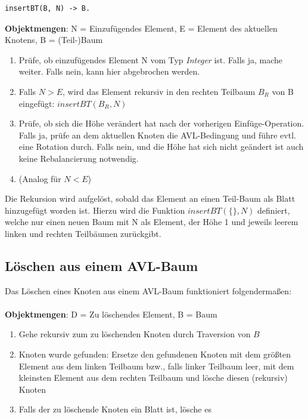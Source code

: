 \documentclass{article}
\begin{document}
\begin{lstlisting}
insertBT(B, N) -> B.
\end{lstlisting}

	\textbf{Objektmengen}: N = Einzufügendes Element, E = Element des aktuellen Knotens, B = (Teil-)Baum
	
	\begin{enumerate}
		\item Prüfe, ob einzufügendes Element N vom Typ \textit{Integer} ist. Falls ja, mache weiter. Falls nein, kann hier abgebrochen werden.
		\item Falls $N > E$, wird das Element rekursiv in den rechten Teilbaum $B_R$ von B eingefügt: $insertBT(B_R, N)$
		\item Prüfe, ob sich die Höhe verändert hat nach der vorherigen Einfüge-Operation. Falls ja, prüfe an dem aktuellen Knoten die AVL-Bedingung und führe evtl. eine Rotation durch. Falls nein, und die Höhe hat sich nicht geändert ist auch keine Rebalancierung notwendig. 
		\item (Analog für $N < E$)
	\end{enumerate}
	
	Die Rekursion wird aufgelöst, sobald das Element an einen Teil-Baum als Blatt hinzugefügt worden ist. Hierzu wird die Funktion $insertBT(\{\}, N)$ definiert, welche nur einen neuen Baum mit N als Element, der Höhe 1 und jeweils leerem linken und rechten Teilbäumen zurückgibt.
	
	\newpage
	\subsection{Löschen aus einem AVL-Baum}

	Das Löschen eines Knoten aus einem AVL-Baum funktioniert folgendermaßen:
	\\\\
	\textbf{Objektmengen}: D = Zu löschendes Element, B = Baum
	
	\begin{enumerate}
		\item Gehe rekursiv zum zu löschenden Knoten durch Traversion von $B$
		\item Knoten wurde gefunden: Ersetze den gefundenen Knoten mit dem größten Element aus dem linken Teilbaum bzw., falls linker Teilbaum leer, mit dem kleinsten Element aus dem rechten Teilbaum und lösche diesen (rekursiv) Knoten
		\item Falls der zu löschende Knoten ein Blatt ist, lösche es
	\end{enumerate}
	
\end{document}
